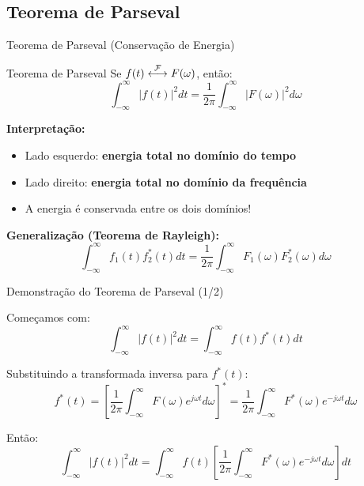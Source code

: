 
\subsection{Teorema de Parseval}

\begin{frame}{Teorema de Parseval (Conservação de Energia)}

\begin{block}{Teorema de Parseval}
Se $f(t) \mathrel{\overset{\mathcal{F}}{\longleftrightarrow}} F(\omega)$, então:
\vspace{-2mm}
\[
\int_{-\infty}^{\infty} |f(t)|^2 dt = \frac{1}{2\pi} \int_{-\infty}^{\infty} |F(\omega)|^2 d\omega
\]
\vspace{-3mm}
\end{block}

\textbf{Interpretação:}
\begin{itemize}
\item Lado esquerdo: \textbf{energia total no domínio do tempo}
\item Lado direito: \textbf{energia total no domínio da frequência}
\item A energia é conservada entre os dois domínios!
\end{itemize}

\textbf{Generalização (Teorema de Rayleigh):}
\vspace{-2mm}
\[
\int_{-\infty}^{\infty} f_1(t) f_2^*(t) dt = \frac{1}{2\pi} \int_{-\infty}^{\infty} F_1(\omega) F_2^*(\omega) d\omega
\]

\end{frame}


\begin{frame}{Demonstração do Teorema de Parseval (1/2)}

Começamos com:
\[
\int_{-\infty}^{\infty} |f(t)|^2 dt = \int_{-\infty}^{\infty} f(t) f^*(t) dt
\]

Substituindo a transformada inversa para $f^*(t)$:
\[
f^*(t) = \left[\frac{1}{2\pi} \int_{-\infty}^{\infty} F(\omega) e^{j\omega t} d\omega\right]^* = \frac{1}{2\pi} \int_{-\infty}^{\infty} F^*(\omega) e^{-j\omega t} d\omega
\]

Então:
\[
\int_{-\infty}^{\infty} |f(t)|^2 dt = \int_{-\infty}^{\infty} f(t) \left[\frac{1}{2\pi} \int_{-\infty}^{\infty} F^*(\omega) e^{-j\omega t} d\omega\right] dt
\]

\end{frame}

